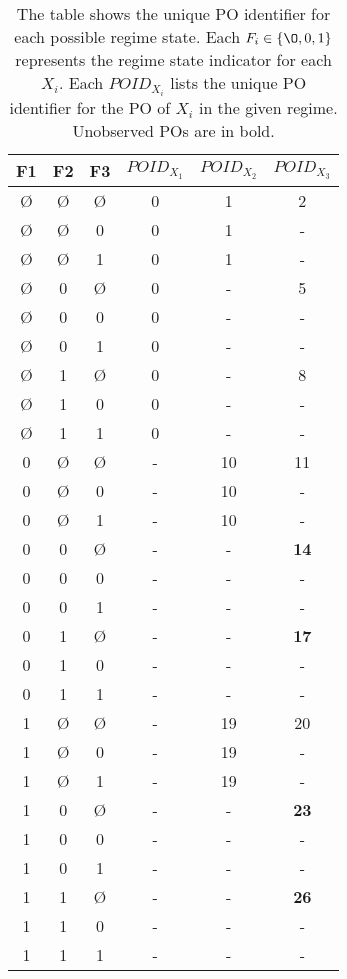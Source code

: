 \begin{table}[!htbp]
\begin{tabular}{ |c|c|c|c|c|c| }
\hline
F1 & F2 & F3 & $POID_{X_1}$ & $POID_{X_2}$ & $POID_{X_3}$ \\ \hline
\O & \O & \O & 0 & 1 & 2 \\ \hline
\O & \O & 0 & 0 & 1 & - \\ \hline
\O & \O & 1 & 0 & 1 & - \\ \hline
\O & 0 & \O & 0 & - & 5 \\ \hline
\O & 0 & 0 & 0 & - & - \\ \hline
\O & 0 & 1 & 0 & - & - \\ \hline
\O & 1 & \O & 0 & - & 8 \\ \hline
\O & 1 & 0 & 0 & - & - \\ \hline
\O & 1 & 1 & 0 & - & - \\ \hline
0 & \O & \O & - & 10 & 11 \\ \hline
0 & \O & 0 & - & 10 & - \\ \hline
0 & \O & 1 & - & 10 & - \\ \hline
0 & 0 & \O & - & - & \textbf{14} \\ \hline
0 & 0 & 0 & - & - & - \\ \hline
0 & 0 & 1 & - & - & - \\ \hline
0 & 1 & \O & - & - & \textbf{17} \\ \hline
0 & 1 & 0 & - & - & - \\ \hline
0 & 1 & 1 & - & - & - \\ \hline
1 & \O & \O & - & 19 & 20 \\ \hline
1 & \O & 0 & - & 19 & - \\ \hline
1 & \O & 1 & - & 19 & - \\ \hline
1 & 0 & \O & - & - & \textbf{23} \\ \hline
1 & 0 & 0 & - & - & - \\ \hline
1 & 0 & 1 & - & - & - \\ \hline
1 & 1 & \O & - & - & \textbf{26} \\ \hline
1 & 1 & 0 & - & - & - \\ \hline
1 & 1 & 1 & - & - & - \\ \hline

\end{tabular}

\caption{The table shows the unique PO identifier for each possible regime state. Each $F_i \in \{ \O ,0,1\}$ represents the regime state indicator for each $X_i$. Each $POID_{X_i}$ lists the unique PO identifier for the PO of $X_i$ in the given regime. Unobserved POs are in bold.}
\label{tab:example_PO_IDS} 
\end{table}
